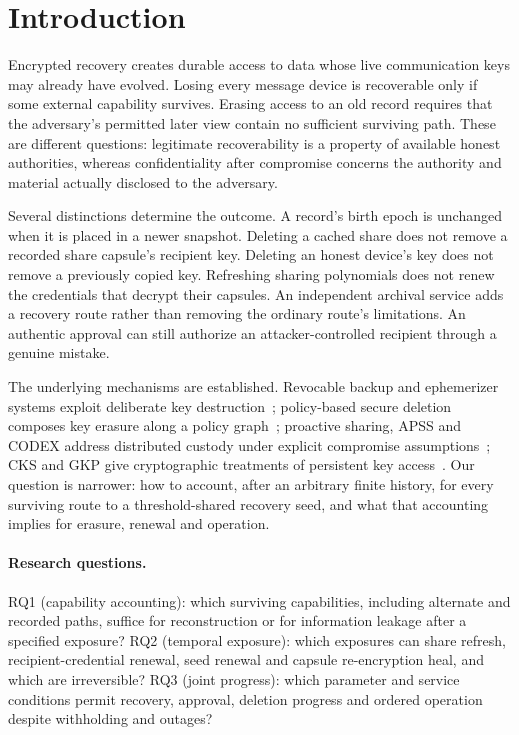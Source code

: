 \documentclass[pdflatex,sn-mathphys-num]{sn-jnl}
\theoremstyle{plain}
\theoremstyle{definition}
\begin{document}
\maketitle


\section{Introduction}\label{sec:intro}

Encrypted recovery creates durable access to data whose live communication keys may already have evolved. Losing every message device is recoverable only if some external capability survives. Erasing access to an old record requires that the adversary's permitted later view contain no sufficient surviving path. These are different questions: legitimate recoverability is a property of available honest authorities, whereas confidentiality after compromise concerns the authority and material actually disclosed to the adversary.

Several distinctions determine the outcome. A record's birth epoch is unchanged when it is placed in a newer snapshot. Deleting a cached share does not remove a recorded share capsule's recipient key. Deleting an honest device's key does not remove a previously copied key. Refreshing sharing polynomials does not renew the credentials that decrypt their capsules. An independent archival service adds a recovery route rather than removing the ordinary route's limitations. An authentic approval can still authorize an attacker-controlled recipient through a genuine mistake.

The underlying mechanisms are established. Revocable backup and ephemerizer systems exploit deliberate key destruction~\cite{boneh1996,perlman2007}; policy-based secure deletion composes key erasure along a policy graph~\cite{cachin2013}; proactive sharing, APSS and CODEX address distributed custody under explicit compromise assumptions~\cite{ostrovsky1991,herzberg1995,zhou2005,marsh2004}; CKS and GKP give cryptographic treatments of persistent key access~\cite{dodis2024,dodisstandard2024,backendal2026}. Our question is narrower: how to account, after an arbitrary finite history, for every surviving route to a threshold-shared recovery seed, and what that accounting implies for erasure, renewal and operation.

\paragraph{Research questions.}
RQ1 (capability accounting): which surviving capabilities, including alternate and recorded paths, suffice for reconstruction or for information leakage after a specified exposure? RQ2 (temporal exposure): which exposures can share refresh, recipient-credential renewal, seed renewal and capsule re-encryption heal, and which are irreversible? RQ3 (joint progress): which parameter and service conditions permit recovery, approval, deletion progress and ordered operation despite withholding and outages?
\end{document}
